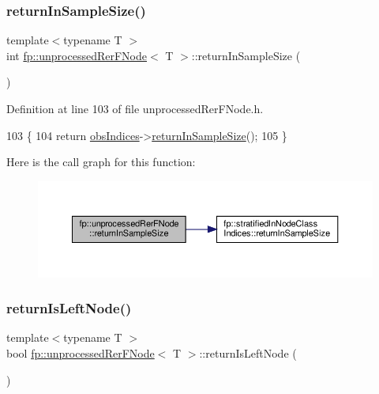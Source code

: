 \subsubsection{\texorpdfstring{return\+In\+Sample\+Size()}{returnInSampleSize()}}
{\footnotesize\ttfamily template$<$typename T $>$ \\
int \hyperlink{classfp_1_1unprocessedRerFNode}{fp\+::unprocessed\+Rer\+F\+Node}$<$ T $>$\+::return\+In\+Sample\+Size (\begin{DoxyParamCaption}{ }\end{DoxyParamCaption})\hspace{0.3cm}{\ttfamily [inline]}}



Definition at line 103 of file unprocessed\+Rer\+F\+Node.\+h.


\begin{DoxyCode}
103                                                \{
104                     \textcolor{keywordflow}{return} \hyperlink{classfp_1_1unprocessedRerFNode_ad52d9d508bf378bc793b8cf961163735}{obsIndices}->\hyperlink{classfp_1_1stratifiedInNodeClassIndices_a596235ffec7250fabd2818d395b39c66}{returnInSampleSize}();
105                 \}
\end{DoxyCode}
Here is the call graph for this function\+:
\nopagebreak
\begin{figure}[H]
\begin{center}
\leavevmode
\includegraphics[width=350pt]{classfp_1_1unprocessedRerFNode_ae8b096a92819dbb811d1319d5c4eaecd_cgraph}
\end{center}
\end{figure}
\mbox{\label{classfp_1_1unprocessedRerFNode_acabfd0846277d68f05f3ba4ca639c29e}} 
\subsubsection{\texorpdfstring{return\+Is\+Left\+Node()}{returnIsLeftNode()}}
{\footnotesize\ttfamily template$<$typename T $>$ \\
bool \hyperlink{classfp_1_1unprocessedRerFNode}{fp\+::unprocessed\+Rer\+F\+Node}$<$ T $>$\+::return\+Is\+Left\+Node (\begin{DoxyParamCaption}{ }\end{DoxyParamCaption})\hspace{0.3cm}{\ttfamily [inline]}}



